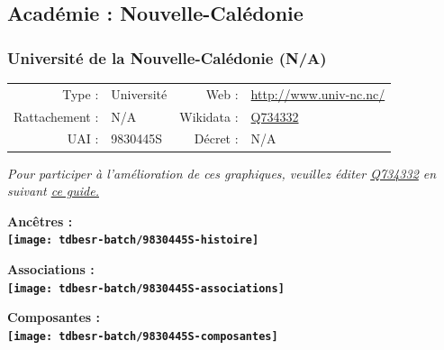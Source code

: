 \documentclass[12pt,french,]{article}
\begin{document}
\hypertarget{acaduxe9mie-nouvelle-caluxe9donie}{%
\subsection{Académie :
Nouvelle-Calédonie}\label{acaduxe9mie-nouvelle-caluxe9donie}}

\hypertarget{universituxe9-de-la-nouvelle-caluxe9donie-na}{%
\subsubsection{Université de la Nouvelle-Calédonie
(N/A)}\label{universituxe9-de-la-nouvelle-caluxe9donie-na}}

\begin{tabular*}{\textwidth}{rp{5cm}rl}  
\hline  
Type : & Université & Web : &\href{http://www.univ-nc.nc/}{http://www.univ-nc.nc/} \\  
Rattachement : & N/A & Wikidata : & \href{https://www.wikidata.org/entity/Q734332}{Q734332} \\  
UAI : & 9830445S & Décret : & N/A \\  
\hline  
\end{tabular*}

\textit{\scriptsize Pour participer à l'amélioration de ces graphiques, veuillez éditer  \href{https://www.wikidata.org/entity/Q734332}{Q734332}  en suivant \href{https://github.com/cpesr/wikidataESR/blob/master/Rmd/wikidataESR.md}{ce guide.}}

\vspace{1cm}  
\begin{minipage}[b]{0.50\textwidth}\begin{center} \bf Ancêtres : \\  
\texttt{[image: tdbesr-batch/9830445S-histoire]} \end{center}\end{minipage}\begin{minipage}[b]{0.50\textwidth}\begin{center} \bf Associations : \\  
\texttt{[image: tdbesr-batch/9830445S-associations]} \end{center}\end{minipage}

\hrulefill

\begin{center} \bf Composantes : \\  
\texttt{[image: tdbesr-batch/9830445S-composantes]} \end{center}
\end{document}

